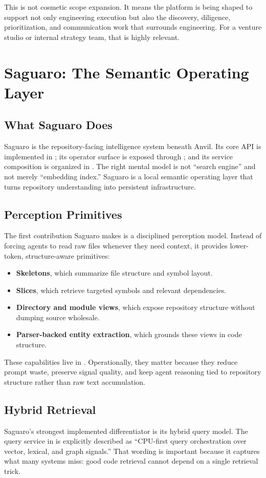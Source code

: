 \documentclass[11pt,a4paper]{article}
\begin{document}
This is not cosmetic scope expansion. It means the platform is being shaped to support not only engineering execution but also the discovery, diligence, prioritization, and communication work that surrounds engineering. For a venture studio or internal strategy team, that is highly relevant.

\section{Saguaro: The Semantic Operating Layer}
\subsection{What Saguaro Does}
Saguaro is the repository-facing intelligence system beneath Anvil. Its core API is implemented in ; its operator surface is exposed through ; and its service composition is organized in . The right mental model is not ``search engine'' and not merely ``embedding index.'' Saguaro is a local semantic operating layer that turns repository understanding into persistent infrastructure.

\subsection{Perception Primitives}
The first contribution Saguaro makes is a disciplined perception model. Instead of forcing agents to read raw files whenever they need context, it provides lower-token, structure-aware primitives:
\begin{itemize}
    \item \textbf{Skeletons}, which summarize file structure and symbol layout.
    \item \textbf{Slices}, which retrieve targeted symbols and relevant dependencies.
    \item \textbf{Directory and module views}, which expose repository structure without dumping source wholesale.
    \item \textbf{Parser-backed entity extraction}, which grounds these views in code structure.
\end{itemize}

These capabilities live in . Operationally, they matter because they reduce prompt waste, preserve signal quality, and keep agent reasoning tied to repository structure rather than raw text accumulation.

\subsection{Hybrid Retrieval}
Saguaro's strongest implemented differentiator is its hybrid query model. The query service in  is explicitly described as ``CPU-first query orchestration over vector, lexical, and graph signals.'' That wording is important because it captures what many systems miss: good code retrieval cannot depend on a single retrieval trick.
\end{document}
